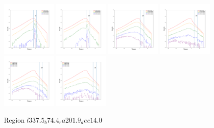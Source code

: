 \documentclass[12pt,prd]{article}
\begin{document}
\begin{figure}[h!]
\includegraphics[width=0.24\textwidth]{../figures/scanning_plotsgaiascan_l337_5_b74_4_ra201_9_dec14_0_npy_12.pdf}
\includegraphics[width=0.24\textwidth]{../figures/scanning_plotsgaiascan_l337_5_b74_4_ra201_9_dec14_0_npy_13.pdf}
\includegraphics[width=0.24\textwidth]{../figures/scanning_plotsgaiascan_l337_5_b74_4_ra201_9_dec14_0_npy_14.pdf}
\includegraphics[width=0.24\textwidth]{../figures/scanning_plotsgaiascan_l337_5_b74_4_ra201_9_dec14_0_npy_15.pdf}
\includegraphics[width=0.24\textwidth]{../figures/scanning_plotsgaiascan_l337_5_b74_4_ra201_9_dec14_0_npy_16.pdf}
\includegraphics[width=0.24\textwidth]{../figures/scanning_plotsgaiascan_l337_5_b74_4_ra201_9_dec14_0_npy_17.pdf}
\caption{Region $l337.5_b74.4_ra201.9_dec14.0$}
\end{figure}
\end{document}
